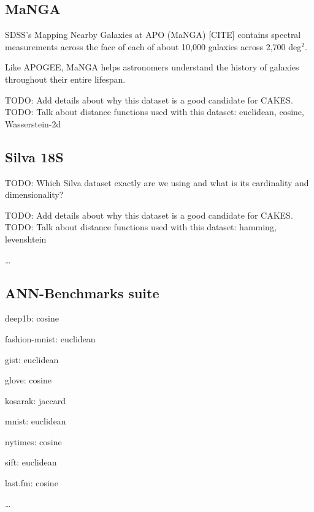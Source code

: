 \subsection{MaNGA}
\label{subsec:datasets:manga}
SDSS's Mapping Nearby Galaxies at APO (MaNGA) [CITE] contains spectral measurements across the face of each of 
about 10,000 galaxies across 2,700 deg$^2$. 

Like APOGEE, MaNGA helps astronomers understand the history of galaxies throughout their entire lifespan. 

TODO: Add details about why this dataset is a good candidate for CAKES. 
TODO: Talk about distance functions used with this dataset: euclidean, cosine, Wasserstein-2d

\subsection{Silva 18S}
\label{subsec:datasets:silva-18s}

TODO: Which Silva dataset exactly are we using and what is its cardinality and dimensionality?

TODO: Add details about why this dataset is a good candidate for CAKES.
TODO: Talk about distance functions used with this dataset: hamming, levenshtein

\dots

\subsection{ANN-Benchmarks suite}
\label{subsec:datasets:ann-benchmarks-suite}

deep1b: cosine

fashion-mnist: euclidean

gist: euclidean

glove: cosine

kosarak: jaccard

mnist: euclidean

nytimes: cosine

sift: euclidean

last.fm: cosine

\dots
